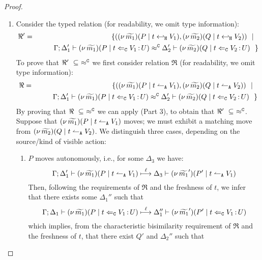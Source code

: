 \begin{proof}
\begin{enumerate}[1.]
		\item	Consider the typed relation (for readability, we omit type information):
				\begin{eqnarray*}
					\Re'	&=&		\{	((\nu\, \widetilde{m_1})(P \;|\; t \hookleftarrow_{\mathtt{H}} V_1),
										(\nu\, \widetilde{m_2})(Q \;|\; t \hookleftarrow_{\mathtt{H}} V_2))
								\ \ |\ \ \\
						&&			\qquad \Gamma; \Delta_1' \vdash (\nu\, \widetilde{m_1})(P \;|\; t \Leftarrow_{\mathtt{C}} V_1{\,:\,}U) \approx^\mathtt{C} \Delta_2' \vdash (\nu\, \widetilde{m_2})(Q \;|\; t \Leftarrow_{\mathtt{C}} V_2{\,:\,}U)~~\}
				\end{eqnarray*}
				To prove that $\Re'\ \subseteq\ \fwb$ we
				first consider relation $\Re$ (for readability, we omit type information):
				\begin{eqnarray*}
					\Re	&=&		\{	((\nu\, \widetilde{m_1})(P \;|\; t \leftharpoonup_\mathtt{A} V_1),
										(\nu\, \widetilde{m_2})(Q \;|\; t \leftharpoonup_\mathtt{A} V_2))
								\ \ |\ \ \\
						&&			\qquad \Gamma; \Delta_1' \vdash (\nu\, \widetilde{m_1})(P \;|\; t \Leftarrow_{\mathtt{C}} V_1{\,:\,}U) \approx^\mathtt{C} \Delta_2' \vdash (\nu\, \widetilde{m_2})(Q \;|\; t \Leftarrow_{\mathtt{C}} V_2{\,:\,}U)~~\}
				\end{eqnarray*}
				By proving that $\Re\ \subseteq\ \fwb$ we can apply  (Part 3), to
				obtain that $\Re'\ \subseteq\ \fwb$.
Suppose that $(\nu\, \widetilde{m_1})(P \;|\; t \leftharpoonup_\mathtt{A} V_1)$ moves; we must exhibit a matching move from
$(\nu\, \widetilde{m_2})(Q \;|\; t \leftharpoonup_\mathtt{A} V_2)$.
			We distinguish three cases, depending on the source/kind of visible action: 
				\begin{enumerate}
					\item $P$ moves autonomously, i.e., for some $\Delta_3$ we have:
						\[
							\Gamma; \Delta_1' \vdash (\nu\, \widetilde{m_1})(P \;|\; t \leftharpoonup_\mathtt{A} V_1) \stackrel{\ell}{\longmapsto} \Delta_3 \vdash (\nu\, \widetilde{m_1}')(P' \;|\; t \leftharpoonup_\mathtt{A} V_1)
						\]
							Then, following the requirements of $\Re$ and the freshness of $t$, 
							we infer that there exists some $\Delta_1''$ such that
						\[
							\Gamma; \Delta_1 \vdash (\nu\, \widetilde{m_1})(P \;|\; t \Leftarrow_{\mathtt{C}} V_1{\,:\,}U) \stackrel{\ell}{\longmapsto} \Delta_1'' \vdash (\nu\, \widetilde{m_1}')(P' \;|\; t \Leftarrow_{\mathtt{C}} V_1{\,:\,}U)
						\]
							which implies, from the characteristic bisimilarity requirement of $\Re$ and
							the freshness of $t$, that there exist $Q'$ and $\Delta_2''$ such that

\end{enumerate}
\end{enumerate}
\end{proof}
